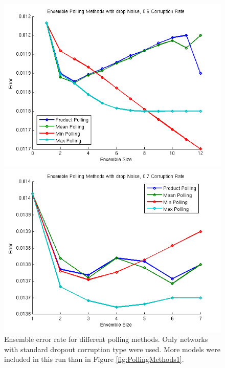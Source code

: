 \documentclass{article} %
\begin{document}
\begin{figure}[ht]
\begin{minipage}[b]{0.5\linewidth}
    \centering
    \includegraphics[width=\linewidth]{methods6a} 
    \vspace{4ex}
  \end{minipage}%
  \begin{minipage}[b]{0.5\linewidth}
    \centering
    \includegraphics[width=\linewidth]{methods5a} 
    \vspace{4ex}
  \end{minipage} 
  \caption{Ensemble error rate for different polling methods. Only networks with standard dropout corruption type were used. More models were included in this run than in Figure \ref{fig:PollingMethods1}.}
\end{figure}
\end{document}
